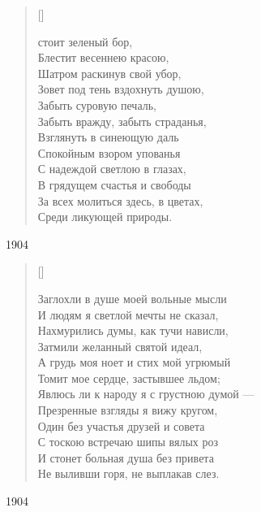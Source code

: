 \settowidth{\versewidth}{За всех молиться здесь, в цветах}
\begin{verse}[\versewidth]
\begin{patverse*}
 стоит зеленый бор,\\
Блестит весеннею красою,\\
Шатром раскинув свой убор,\\
Зовет под тень вздохнуть душою,\\
Забыть суровую печаль,\\
Забыть вражду, забыть страданья,\\
Взглянуть в синеющую даль\\
Спокойным взором упованья\\
С надеждой светлою в глазах,\\
В грядущем счастья и свободы\\
За всех молиться здесь, в цветах,\\
Среди ликующей природы.
\end{patverse*}
\end{verse}
1904




\settowidth{\versewidth}{Заглохли в душе моей вольные мысли}
\begin{verse}[\versewidth]
\begin{altverse}
Заглохли в душе моей вольные мысли\\
И людям я светлой мечты не сказал,\\
Нахмурились думы, как тучи нависли,\\
Затмили желанный святой идеал,\\
А грудь моя ноет и стих мой угрюмый\\
Томит мое сердце, застывшее льдом;\\
Явлюсь ли к народу я с грустною думой ---\\
Презренные взгляды я вижу кругом,\\
Один без участья друзей и совета\\
С тоскою встречаю шипы вялых роз\\
И стонет больная душа без привета\\
Не выливши горя, не выплакав слез.
\end{altverse}
\end{verse}
1904



